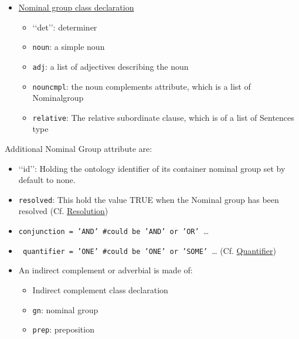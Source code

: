 \documentclass[twoside,a4paper,10pt]{report}
\begin{document}
\begin{itemize}
    \item  \underline{Nominal group class declaration}
\begin{itemize}
    \item  ‘‘det’’: determiner
    \item  \texttt{noun}: a simple noun
    \item  \texttt{adj}: a list of adjectives describing the noun
    \item  \texttt{noun{\textunderscore}cmpl}: the noun complements attribute, which is a list of Nominal{\textunderscore}group
    \item  \texttt{relative}: The relative subordinate clause, which is of a list of Sentences type
\end{itemize}

\end{itemize}

Additional Nominal Group attribute are:


\begin{itemize}
    \item  ‘‘id’’: Holding the ontology identifier of its container nominal group set by default to none.
    \item  \texttt{{\textunderscore}resolved}: This hold the value TRUE when the Nominal group has been resolved (Cf. \hyperref[b7e164b34ff76b1cda93a058604190da]{Resolution})
    \item  \texttt{{\textunderscore}conjunction = 'AND' \#could be 'AND' or 'OR' }\ldots{} 
    \item  \texttt{ {\textunderscore}quantifier = 'ONE' \#could be 'ONE' or 'SOME' }\ldots{} (Cf. \hyperref[c9a5eb8d391a77a428b429e98ad45e2c]{Quantifier})
\end{itemize}

\begin{itemize}
    \item  An indirect complement or adverbial is made of: 
\begin{itemize}
    \item  Indirect complement class declaration
    \item  \texttt{gn}: nominal group
    \item  \texttt{prep}: preposition
\end{itemize}

\end{itemize}
\end{document}
